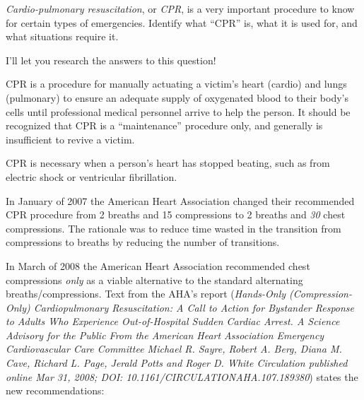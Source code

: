 

{\it Cardio-pulmonary resuscitation}, or {\it CPR}, is a very important procedure to know for certain types of emergencies.  Identify what ``CPR'' is, what it is used for, and what situations require it.







I'll let you research the answers to this question!







CPR is a procedure for manually actuating a victim's heart (cardio) and lungs (pulmonary) to ensure an adequate supply of oxygenated blood to their body's cells until professional medical personnel arrive to help the person.  It should be recognized that CPR is a ``maintenance'' procedure only, and generally is insufficient to revive a victim.

CPR is necessary when a person's heart has stopped beating, such as from electric shock or ventricular fibrillation.

\vskip 10pt

In January of 2007 the American Heart Association changed their recommended CPR procedure from 2 breaths and 15 compressions to 2 breaths and {\it 30} chest compressions.  The rationale was to reduce time wasted in the transition from compressions to breaths by reducing the number of transitions.

In March of 2008 the American Heart Association recommended chest compressions {\it only} as a viable alternative to the standard alternating breaths/compressions.  Text from the AHA's report ({\it Hands-Only (Compression-Only) Cardiopulmonary Resuscitation: A Call to Action for Bystander Response to Adults Who Experience Out-of-Hospital Sudden Cardiac Arrest. A Science Advisory for the Public From the American Heart Association Emergency Cardiovascular Care Committee Michael R. Sayre, Robert A. Berg, Diana M. Cave, Richard L. Page, Jerald Potts and Roger D. White Circulation published online Mar 31, 2008; DOI: 10.1161/CIRCULATIONAHA.107.189380}) states the new recommendations:

